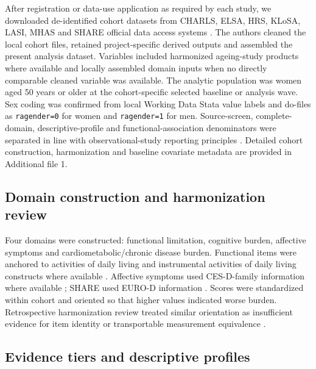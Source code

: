 \documentclass[pdflatex,sn-vancouver-num]{sn-jnl}
\begin{document}
After registration or data-use application as required by each study, we downloaded de-identified cohort datasets from CHARLS, ELSA, HRS, KLoSA, LASI, MHAS and SHARE official data access systems \cite{zhao2014charls,steptoe2013elsa,sonnega2014hrs,keis2026klosa,perianayagam2022lasi,wong2017mhas,borschsupan2013share}. The authors cleaned the local cohort files, retained project-specific derived outputs and assembled the present analysis dataset. Variables included harmonized ageing-study products where available \cite{lee2021gateway} and locally assembled domain inputs when no directly comparable cleaned variable was available. The analytic population was women aged 50 years or older at the cohort-specific selected baseline or analysis wave. Sex coding was confirmed from local Working Data Stata value labels and do-files as \texttt{ragender=0} for women and \texttt{ragender=1} for men. Source-screen, complete-domain, descriptive-profile and functional-association denominators were separated in line with observational-study reporting principles \cite{vonelm2007strobe}. Detailed cohort construction, harmonization and baseline covariate metadata are provided in Additional file 1.

\subsection{Domain construction and harmonization review}

Four domains were constructed: functional limitation, cognitive burden, affective symptoms and cardiometabolic/chronic disease burden. Functional items were anchored to activities of daily living and instrumental activities of daily living constructs where available \cite{katz1963adl,lawton1969iadl}. Affective symptoms used CES-D-family information where available \cite{radloff1977cesd}; SHARE used EURO-D information \cite{prince1999eurod}. Scores were standardized within cohort and oriented so that higher values indicated worse burden. Retrospective harmonization review treated similar orientation as insufficient evidence for item identity or transportable measurement equivalence \cite{doiron2013bioshare,fortier2017maelstrom}.

\subsection{Evidence tiers and descriptive profiles}
\end{document}
